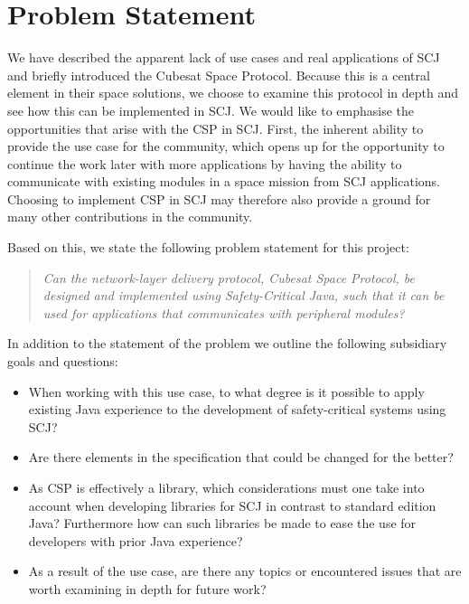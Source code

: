 
\section{Problem Statement} %
\label{sec:problem_statement}
We have described the apparent lack of use cases and real applications of SCJ and briefly introduced the Cubesat Space Protocol. Because this is a central element in their space solutions, we choose to examine this protocol in depth and see how this can be implemented in SCJ. We would like to emphasise the opportunities that arise with the CSP in SCJ. First, the inherent ability to provide the use case for the community, which opens up for the opportunity to continue the work later with more applications by having the ability to communicate with existing modules in a space mission from SCJ applications. Choosing to implement CSP in SCJ may therefore also provide a ground for many other contributions in the community.

Based on this, we state the following problem statement for this project:
\begin{quotation}
	\textit{Can the network-layer delivery protocol, Cubesat Space Protocol, be designed and implemented using Safety-Critical Java, such that it can be used for applications that communicates with peripheral modules?}
\end{quotation}
In addition to the statement of the problem we outline the following subsidiary goals and questions:
\begin{itemize}
	\item When working with this use case, to what degree is it possible to apply existing Java experience to the development of safety-critical systems using SCJ?
	\item Are there elements in the specification that could be changed for the better?
	\item As CSP is effectively a library, which considerations must one take into account when developing libraries for SCJ in contrast to standard edition Java? Furthermore how can such libraries be made to ease the use for developers with prior Java experience?
	\item As a result of the use case, are there any topics or encountered issues that are worth examining in depth for future work?
\end{itemize}

